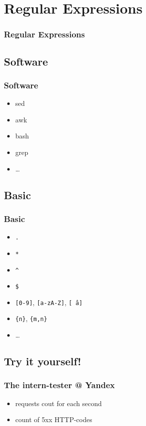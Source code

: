 \documentclass{beamer}
\begin{document}
\section{Regular Expressions}
\begin{frame}
\frametitle<presentation>{Regular Expressions}
\end{frame}

\subsection{Software}
\begin{frame}
\frametitle{Software}
\begin{itemize}
  \item sed
  \item awk
  \item bash
  \item grep
  \item \ldots
\end{itemize}
\end{frame}

\subsection{Basic}
\begin{frame}
\frametitle{Basic}
\begin{itemize}
  \item \texttt{.}
  \item \texttt{*}
  \item \texttt{\^}
  \item \texttt{\$}
  \item \texttt{[0-9]}, \texttt{[a-zA-Z]}, \texttt{[\^\ a]}
  \item \texttt{\{n\}}, \texttt{\{m,n\}}
  \item \ldots
\end{itemize}
\end{frame}

\subsection{Try it yourself!}
\begin{frame}
\frametitle{The intern-tester @ Yandex}

\begin{itemize}
  \item requests cout for each second
  \item count of 5xx HTTP-codes 
\end{itemize}
\end{frame}
\end{document}
